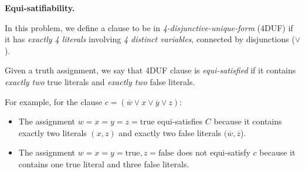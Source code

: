 \documentclass[11pt,addpoints,answers]{exam}
\begin{document}
\begin{questions}

\pagebreak
  \question \textbf{Equi-satifiability.} 

  In this problem, we define a clause to be in \emph{4-disjunctive-unique-form} (4DUF) if it has \emph{exactly 4 literals} involving \emph{4 distinct variables}, connected by disjunctions ($\lor$). 

  Given a truth assignment, we say that 4DUF clause is \emph{equi-satisfied} if it contains \emph{exactly two} true literals and \emph{exactly two} false literals. 
  
  For example, for the clause $c = (\overline w \lor x \lor \overline y \lor z)$: 
  \begin{itemize}
      \item The assignment $w = x = y =z = \text{true}$ equi-satisfies $C$ because it contains exactly two literals $(x,z)$ and exactly two false literals $(\overline w, \overline z$).
      \item The assignment $w = x = y = \text{true}, z = \text{false}$ does not equi-satisfy $c$ because it contains one true literal and three false literals. 
  \end{itemize}


\end{questions}
\end{document}
